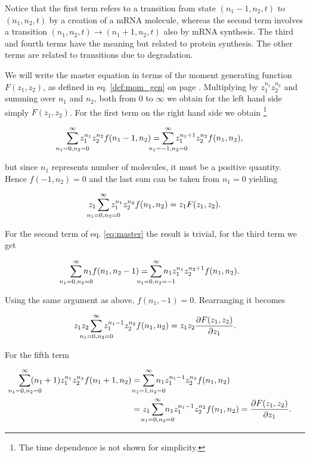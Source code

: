 Notice that the first term refers to a transition from state $(n_1-1,n_2,t)$ to $(n_1,n_2,t)$ by a creation of a mRNA molecule, whereas the second term involves a transition $(n_1,n_2,t) \rightarrow (n_1+1,n_2,t)$ also by mRNA synthesis. The third and fourth terms have the meaning but related to protein synthesis. The other terms are related to transitions due to degradation.

We will write the master equation in terms of the moment generating function $F(z_1,z_2)$, as defined in eq. \eqref{def:mom_gen} on page \pageref{def:mom_gen}. Multiplying by $z_1^{n_1}z_2^{n_2}$ and summing over $n_1$ and $n_2$, both from $0$ to $\infty$ we obtain for the left hand side simply $\dot{F}(z_1,z_2)$. For the first term on the right hand side we obtain \footnote{The time dependence is not shown for simplicity.}

\begin{equation*}
  \sum_{\mathclap{n_1=0,n_2=0}}^\infty z_1^{n_1}z_2^{n_2}f(n_1-1,n_2) = \sum_{\mathclap{n_1=-1,n_2=0}}^\infty z_1^{n_1+1}z_2^{n_2}f(n_1,n_2),
\end{equation*}

but since $n_1$ represents number of molecules, it must be a positive quantity. Hence $f(-1,n_2)=0$ and the last sum can be taken from $n_1=0$ yielding

\begin{equation*}
  z_1 \sum_{\mathclap{n_1=0,n_2=0}}^\infty z_1^{n_1}z_2^{n_2}f(n_1,n_2) = z_1F(z_1,z_2).
\end{equation*}

For the second term of eq. \eqref{eq:master} the result is trivial, for the third term we get

\begin{equation*}
  \sum_{\mathclap{n_1=0,n_2=0}}^\infty n_1f(n_1,n_2-1) = \sum_{\mathclap{n_1=0,n_2=-1}}^\infty n_1z_1^{n_1}z_2^{n_2+1}f(n_1,n_2).
\end{equation*}

Using the same argument as above, $f(n_1,-1) = 0$. Rearranging it becomes

\begin{equation*}
  z_1 z_2 \sum_{\mathclap{n_1=0,n_2=0}}^\infty z_1^{n_1-1}z_2^{n_2}f(n_1,n_2) = z_1 z_2 \frac{\partial F(z_1,z_2)}{\partial z_1}.
\end{equation*}

For the fifth term

\begin{equation*}
  \begin{split}
    \sum_{\mathclap{n_1=0,n_2=0}}^\infty (n_1+1)z_1^{n_1}z_2^{n_2}f(n_1+1,n_2) &= \sum_{\mathclap{n_1=1,n_2=0}}^\infty n_1z_1^{n_1-1}z_2^{n_2}f(n_1,n_2)\\ 
    &= z_1 \sum_{\mathclap{n_1=0,n_2=0}}^\infty n_1z_1^{n_1-1}z_2^{n_2}f(n_1,n_2) = \frac{\partial F(z_1,z_2)}{\partial z_1}.
  \end{split}
\end{equation*}

